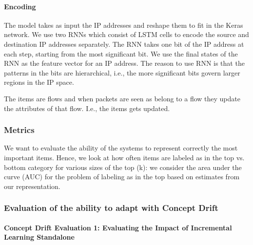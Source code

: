 \paragraph{Encoding}

The model takes as input the IP addresses and reshape them to fit in the Keras network. We use two RNNs which consist of LSTM cells to encode the source and destination IP addresses separately. The RNN takes one bit of the IP address at each step, starting from the most significant bit. We use the final states of the RNN as the feature vector for an IP address. The reason to use RNN is that the patterns in the bits are hierarchical, i.e., the more significant bits govern larger regions in the IP space.

The items are flows and when packets are seen as belong to a flow they update the attributes of that flow. I.e., the items gets updated.


\subsubsection{Metrics}
We want to evaluate the ability of the systems to represent correctly the most important items.
Hence, we look at how often items are labeled as in the top vs. bottom category for various sizes of the top (k): we consider the area under the curve (AUC) for the problem of labeling as in the top based on estimates from our representation.


\subsubsection{Evaluation of the ability to adapt with Concept Drift}

\paragraph{Concept Drift Evaluation 1: Evaluating the Impact of Incremental Learning Standalone}



